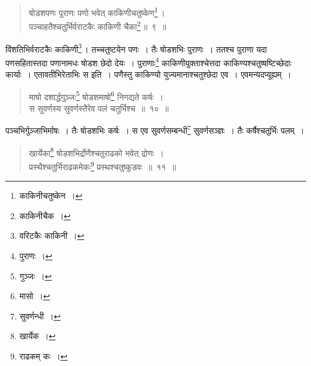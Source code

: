 \documentclass[10pt, openany]{book}
\begin{document}
\begin{quote}
    
 {\bs षोडशपणः पुराणः पणो भवेत् काकिणीचतुष्केण\renewcommand{\thefootnote}{\s ८}\footnote{\s काकिनीचतुष्केन~।}\,। \\
 पञ्चाहतैश्चतुर्भिर्वराटकैः काकिणी चैका\renewcommand{\thefootnote}{\s ९}\footnote{\s काकिनीचैक~।}\,॥~९~॥}\end{quote}

{विंशतिभिर्वराटकैः काकिणी\renewcommand{\thefootnote}{\s १०}\footnote{\s *वरिटकैः काकिनी~।}\,। तच्चतुष्टयेन पणः~। तैः षोडशभिः पुराणः~। ततश्च}
{पुराणा यदा पणसहितास्तदा पणानामधः षोडश छेदो देयः~। पुराणाः\renewcommand{\thefootnote}{\s ११}\footnote{\s पुराणः~।}
काकिणीयुक्ताश्चेत्तदा काकिण्यश्चतुष्षष्टिच्छेदाः कार्याः~। एतावतीभिरेताभिः स इति~।
पणैस्तु काकिण्यो युज्यमानाश्चतुश्छेदा एव~। एवमन्यदप्यूह्यम्~।}
\begin{quote}


{\bs माषो दशार्द्धगुञ्जः\renewcommand{\thefootnote}{\s १२}\footnote{\s *गुञ्जः~।} षोडशमाषो\renewcommand{\thefootnote}{\s १३}\footnote{\s *मासो~।} निगद्यते कर्षः~। \\
स सुवर्णस्य सुवर्णस्तैरेव पलं चतुर्भिश्च~॥~१०~॥}\end{quote}

{पञ्चभिर्गुञ्जाभिर्माषः~। तैः षोडशभिः कर्षः~। स एव सुवर्णसम्बन्धी\renewcommand{\thefootnote}{\s १४}\footnote{\s सुवर्णन्धी~।}
सुवर्णसञ्ज्ञः~। तैः कर्षैश्चतुर्भिः पलम्~।}

\begin{quote} {\bs खार्येका\renewcommand{\thefootnote}{\s १५}\footnote{\s खार्येक~।} षोडशभिर्द्रोणैश्चतुराढको भवेत् द्रोणः~। \\
 प्रस्थैश्चतुर्भिराढकमेकः\renewcommand{\thefootnote}{\s १६}\footnote{\s राढकम् कः~।} प्रस्थश्चतुष्कुडवः~॥~११~॥}\end{quote}



\newpage
\end{document}
